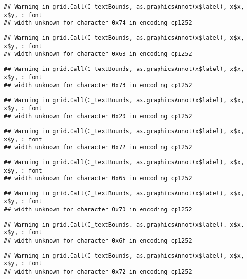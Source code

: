 \documentclass[
]{article}
\begin{document}
\begin{verbatim}
## Warning in grid.Call(C_textBounds, as.graphicsAnnot(x$label), x$x, x$y, : font
## width unknown for character 0x74 in encoding cp1252
\end{verbatim}

\begin{verbatim}
## Warning in grid.Call(C_textBounds, as.graphicsAnnot(x$label), x$x, x$y, : font
## width unknown for character 0x68 in encoding cp1252
\end{verbatim}

\begin{verbatim}
## Warning in grid.Call(C_textBounds, as.graphicsAnnot(x$label), x$x, x$y, : font
## width unknown for character 0x73 in encoding cp1252
\end{verbatim}

\begin{verbatim}
## Warning in grid.Call(C_textBounds, as.graphicsAnnot(x$label), x$x, x$y, : font
## width unknown for character 0x20 in encoding cp1252
\end{verbatim}

\begin{verbatim}
## Warning in grid.Call(C_textBounds, as.graphicsAnnot(x$label), x$x, x$y, : font
## width unknown for character 0x72 in encoding cp1252
\end{verbatim}

\begin{verbatim}
## Warning in grid.Call(C_textBounds, as.graphicsAnnot(x$label), x$x, x$y, : font
## width unknown for character 0x65 in encoding cp1252
\end{verbatim}

\begin{verbatim}
## Warning in grid.Call(C_textBounds, as.graphicsAnnot(x$label), x$x, x$y, : font
## width unknown for character 0x70 in encoding cp1252
\end{verbatim}

\begin{verbatim}
## Warning in grid.Call(C_textBounds, as.graphicsAnnot(x$label), x$x, x$y, : font
## width unknown for character 0x6f in encoding cp1252
\end{verbatim}

\begin{verbatim}
## Warning in grid.Call(C_textBounds, as.graphicsAnnot(x$label), x$x, x$y, : font
## width unknown for character 0x72 in encoding cp1252
\end{verbatim}
\end{document}
